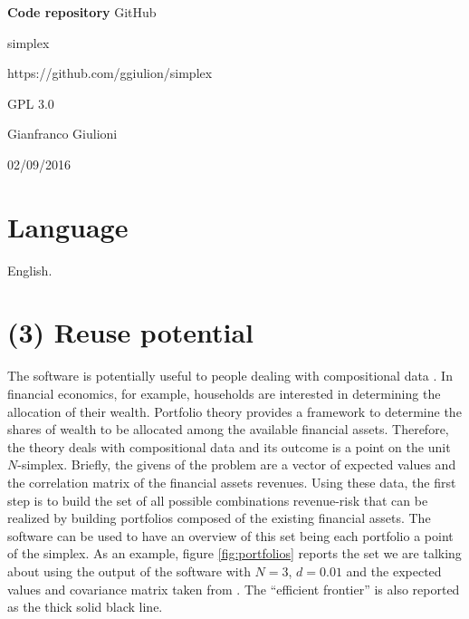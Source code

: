\documentclass{jors}
\begin{document}
{\bf Code repository} GitHub

\begin{description}[noitemsep,topsep=0pt]
	\item[Name:] simplex
	\item[Persistent identifier:] https://github.com/ggiulion/simplex
	\item[Licence:] GPL 3.0
	\item[Publisher:]  Gianfranco Giulioni
	\item[Date published:] 02/09/2016
\end{description}



\section*{Language}
English.

\section*{(3) Reuse potential}

The software is potentially useful to people dealing with compositional data \cite{coda15}. In financial economics, for example, households are interested in determining the allocation of their wealth. Portfolio theory provides a framework to determine the shares of wealth to be allocated among the available financial assets. Therefore, the theory deals with compositional data and its outcome is a point on the unit $N$-simplex. 
Briefly, the givens of the problem are a vector of expected values and the correlation matrix of the financial assets revenues. Using these data, the first step is to build the set of all possible combinations revenue-risk that can be realized by building portfolios composed of the existing financial assets. The software can be used to have an overview of this set being each portfolio a point of the simplex. 
As an example, figure \ref{fig:portfolios} reports the set we are talking about using the output of the software with $N=3$, $d=0.01$ and the expected values and covariance matrix taken from \cite{zivot2008}. 
The ``efficient frontier'' is also reported as the thick solid black line.  
\end{document}
